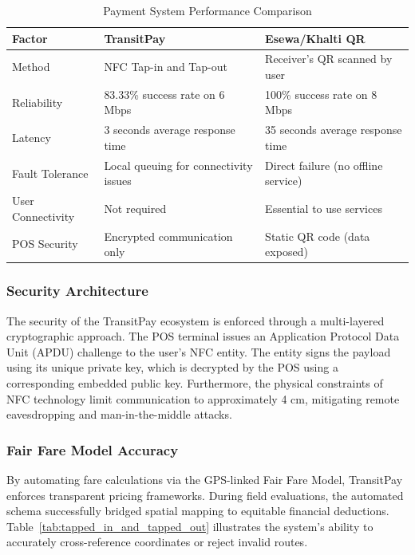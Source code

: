 \documentclass[manuscript,review,anonymous]{acmart}
\begin{document}
\begin{table}[t]
  \centering
  \caption{Payment System Performance Comparison}
  \label{tab:comparison}
  \begin{tabularx}{\columnwidth}{>{\RaggedRight\arraybackslash}p{2.5cm}X X}
    \toprule
    \textbf{Factor} & \textbf{TransitPay} & \textbf{Esewa/Khalti QR} \\
    \midrule
    Method & NFC Tap-in and Tap-out & Receiver's QR scanned by user \\
    Reliability & 83.33\% success rate on 6 Mbps & 100\% success rate on 8 Mbps \\
    Latency & 3 seconds average response time & 35 seconds average response time \\
    Fault Tolerance & Local queuing for connectivity issues & Direct failure (no offline service) \\
    User Connectivity & Not required & Essential to use services \\
    POS Security & Encrypted communication only & Static QR code (data exposed) \\
    \bottomrule
  \end{tabularx}
\end{table}

\subsubsection{Security Architecture}
The security of the TransitPay ecosystem is enforced through a multi-layered cryptographic approach. The POS terminal issues an Application Protocol Data Unit (APDU) challenge to the user's NFC entity. The entity signs the payload using its unique private key, which is decrypted by the POS using a corresponding embedded public key. Furthermore, the physical constraints of NFC technology limit communication to approximately 4 cm, mitigating remote eavesdropping and man-in-the-middle attacks.

\subsubsection{Fair Fare Model Accuracy}
By automating fare calculations via the GPS-linked Fair Fare Model, TransitPay enforces transparent pricing frameworks. During field evaluations, the automated schema successfully bridged spatial mapping to equitable financial deductions. Table~\ref{tab:tapped_in_and_tapped_out} illustrates the system's ability to accurately cross-reference coordinates or reject invalid routes.
\end{document}
